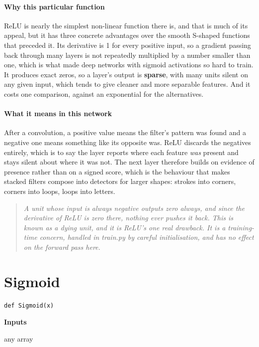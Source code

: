 \paragraph{Why this particular function}
ReLU is nearly the simplest non-linear function there is, and that is much of its appeal, but it has three concrete advantages over the smooth S-shaped functions that preceded it. Its derivative is 1 for every positive input, so a gradient passing back through many layers is not repeatedly multiplied by a number smaller than one, which is what made deep networks with sigmoid activations so hard to train. It produces exact zeros, so a layer's output is \textbf{sparse}, with many units silent on any given input, which tends to give cleaner and more separable features. And it costs one comparison, against an exponential for the alternatives.


\paragraph{What it means in this network}
After a convolution, a positive value means the filter's pattern was found and a negative one means something like its opposite was. ReLU discards the negatives entirely, which is to say the layer reports where each feature \emph{was} present and stays silent about where it was not. The next layer therefore builds on evidence of presence rather than on a signed score, which is the behaviour that makes stacked filters compose into detectors for larger shapes: strokes into corners, corners into loops, loops into letters.


\begin{quote}\small\itshape A unit whose input is always negative outputs zero always, and since the derivative of ReLU is zero there, nothing ever pushes it back. This is known as a dying unit, and it is ReLU's one real drawback. It is a training-time concern, handled in train.py by careful initialisation, and has no effect on the forward pass here.\end{quote}

\section{Sigmoid}
\begin{lstlisting}[style=sig]
def Sigmoid(x)
\end{lstlisting}

\noindent\textbf{Inputs}
\begin{description}[leftmargin=2.2em,style=nextline,font=\normalfont\ttfamily]\setlength\itemsep{1pt}
  \item[{x}] \normalfont any array
\end{description}

